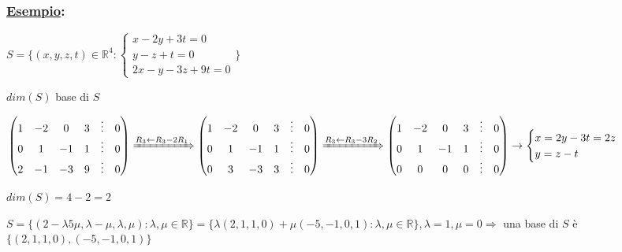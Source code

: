 \documentclass{article}
\newcommand{\ul}[1]{\underline{#1}}
\newcommand{\R}{\mathbb{R}}
\newcommand{\Esempio}[1]{\subsubsection*{\ul{Esempio}:}#1}
\begin{document}
\Esempio{
	$S=\{(x,y,z,t)\in\R^4:
	\begin{cases}
		x-2y+3t=0\\
		y-z+t=0\\
		2x-y-3z+9t=0
	\end{cases}\}$

	$dim(S)$ base di $S$

	$\begin{pmatrix}
		1&-2&0&3&\vdots&0\\
		0&1&-1&1&\vdots&0\\
		2&-1&-3&9&\vdots&0
	\end{pmatrix}\xRightarrow{R_3\leftarrow R_3-2R_1}
	\begin{pmatrix}
		1&-2&0&3&\vdots&0\\
		0&1&-1&1&\vdots&0\\
		0&3&-3&3&\vdots&0
	\end{pmatrix}\xRightarrow{R_3\leftarrow R_3-3R_2}
	\begin{pmatrix}
		1&-2&0&3&\vdots&0\\
		0&1&-1&1&\vdots&0\\
		0&0&0&0&\vdots&0
	\end{pmatrix}\rightarrow\begin{cases}
		x=2y-3t=2z\\
		y=z-t
	\end{cases}$

	$dim(S)=4-2=2$

	$S=\{(2-\lambda5\mu,\lambda-\mu,\lambda,\mu):\lambda,\mu\in\R\}=\{\lambda(2,1,1,0)+\mu(-5,-1,0,1):\lambda,\mu\in\R\}, \lambda=1, \mu=0\Rightarrow$ una base di $S$ è $\{(2,1,1,0),(-5,-1,0,1)\}$
}
\end{document}
